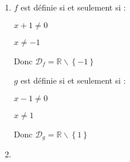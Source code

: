 \begin{corrige}
     \begin{enumerate}
          \item
          $f$ est définie si et seulement si :
          \par
          $x+1\neq 0$
          \par
          $x\neq -1$
          \par
          Donc $\mathscr D_{f}=\mathbb{R}\backslash\left\{-1\right\}$
          \par
          $g$ est définie si et seulement si :
          \par
          $x-1\neq 0$
          \par
          $x\neq 1$
          \par
          Donc $\mathscr D_{g}=\mathbb{R}\backslash\left\{1\right\}$
          \item



\end{enumerate}
\end{corrige}
